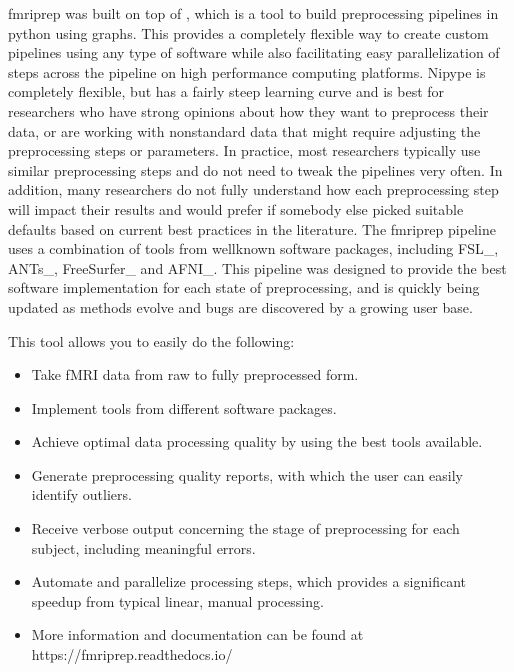 \documentclass[letterpaper,10pt,english]{sphinxmanual}
\begin{document}
fmriprep was built on top of , which is a tool to build preprocessing pipelines in python using graphs. This provides a completely flexible way to create custom pipelines using any type of software while also facilitating easy parallelization of steps across the pipeline on high performance computing platforms. Nipype is completely flexible, but has a fairly steep learning curve and is best for researchers who have strong opinions about how they want to preprocess their data, or are working with nonstandard data that might require adjusting the preprocessing steps or parameters. In practice, most researchers typically use similar preprocessing steps and do not need to tweak the pipelines very often. In addition, many researchers do not fully understand how each preprocessing step will impact their results and would prefer if somebody else picked suitable defaults based on current best practices in the literature. The fmriprep pipeline uses a combination of tools from well\sphinxhyphen{}known software packages, including FSL\_, ANTs\_, FreeSurfer\_ and AFNI\_. This pipeline was designed to provide the best software implementation for each state of preprocessing, and is quickly being updated as methods evolve and bugs are discovered by a growing user base.

This tool allows you to easily do the following:
\begin{itemize}
\item {} 
Take fMRI data from raw to fully preprocessed form.

\item {} 
Implement tools from different software packages.

\item {} 
Achieve optimal data processing quality by using the best tools available.

\item {} 
Generate preprocessing quality reports, with which the user can easily identify outliers.

\item {} 
Receive verbose output concerning the stage of preprocessing for each subject, including meaningful errors.

\item {} 
Automate and parallelize processing steps, which provides a significant speed\sphinxhyphen{}up from typical linear, manual processing.

\item {} 
More information and documentation can be found at https://fmriprep.readthedocs.io/

\end{itemize}
\end{document}
